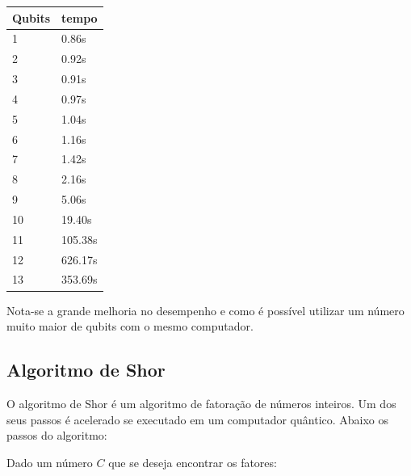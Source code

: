\documentclass[12pt,a4paper]{article}
\begin{document}
\begin{table}[htb]
\centering
\begin{adjustbox}{center}
\begin{tabular}{|l|l|}  
\hline
Qubits  & tempo \\ \hline
1  & 0.86s \\ \hline
2  &  0.92s\\ \hline
3  &   0.91s\\ \hline
4  &  0.97s\\ \hline
5  &  1.04s\\ \hline
6  &   1.16s\\ \hline

7  &   1.42s\\ \hline

8  &   2.16s\\ \hline

9  &   5.06s\\ \hline

10  &   19.40s\\ \hline

11 &   105.38s\\ \hline

12 &   626.17s\\ \hline

13 &   353.69s\\ \hline

\end{tabular}
\end{adjustbox}
\end{table}
Nota-se a grande melhoria no desempenho e como é possível utilizar um número muito maior de qubits com o mesmo computador.

\subsection{Algoritmo de Shor}
 O algoritmo de Shor é um algoritmo de fatoração de números inteiros. Um dos seus passos é acelerado se executado em um computador quântico. Abaixo os passos do algoritmo:

Dado um número $C$ que se deseja encontrar os fatores:
\end{document}
